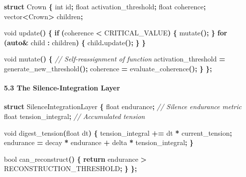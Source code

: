\documentclass[
  11pt,
  a4paper,
]{article}
\newenvironment{Shaded}{\begin{snugshade}}{\end{snugshade}}
\newcommand{\CommentTok}[1]{\textcolor[rgb]{0.56,0.35,0.01}{\textit{#1}}}
\newcommand{\ControlFlowTok}[1]{\textcolor[rgb]{0.13,0.29,0.53}{\textbf{#1}}}
\newcommand{\DataTypeTok}[1]{\textcolor[rgb]{0.13,0.29,0.53}{#1}}
\newcommand{\KeywordTok}[1]{\textcolor[rgb]{0.13,0.29,0.53}{\textbf{#1}}}
\newcommand{\NormalTok}[1]{#1}
\newcommand{\OperatorTok}[1]{\textcolor[rgb]{0.81,0.36,0.00}{\textbf{#1}}}
\begin{document}
\begin{Shaded}
\begin{Highlighting}[]
\KeywordTok{struct}\NormalTok{ Crown }\OperatorTok{\{}
    \DataTypeTok{int}\NormalTok{ id}\OperatorTok{;}
    \DataTypeTok{float}\NormalTok{ activation\_threshold}\OperatorTok{;}
    \DataTypeTok{float}\NormalTok{ coherence}\OperatorTok{;}
\NormalTok{    vector}\OperatorTok{\textless{}}\NormalTok{Crown}\OperatorTok{\textgreater{}}\NormalTok{ children}\OperatorTok{;}
    
    \DataTypeTok{void}\NormalTok{ update}\OperatorTok{()} \OperatorTok{\{}
        \ControlFlowTok{if} \OperatorTok{(}\NormalTok{coherence }\OperatorTok{\textless{}}\NormalTok{ CRITICAL\_VALUE}\OperatorTok{)} \OperatorTok{\{}
\NormalTok{            mutate}\OperatorTok{();}
        \OperatorTok{\}}
        \ControlFlowTok{for} \OperatorTok{(}\KeywordTok{auto}\OperatorTok{\&}\NormalTok{ child }\OperatorTok{:}\NormalTok{ children}\OperatorTok{)} \OperatorTok{\{}
\NormalTok{            child}\OperatorTok{.}\NormalTok{update}\OperatorTok{();}
        \OperatorTok{\}}
    \OperatorTok{\}}
    
    \DataTypeTok{void}\NormalTok{ mutate}\OperatorTok{()} \OperatorTok{\{}
        \CommentTok{// Self{-}reassignment of function}
\NormalTok{        activation\_threshold }\OperatorTok{=}\NormalTok{ generate\_new\_threshold}\OperatorTok{();}
\NormalTok{        coherence }\OperatorTok{=}\NormalTok{ evaluate\_coherence}\OperatorTok{();}
    \OperatorTok{\}}
\OperatorTok{\};}
\end{Highlighting}
\end{Shaded}

\paragraph{5.3 The Silence-Integration
Layer}\label{the-silence-integration-layer}

\begin{Shaded}
\begin{Highlighting}[]
\KeywordTok{struct}\NormalTok{ SilenceIntegrationLayer }\OperatorTok{\{}
    \DataTypeTok{float}\NormalTok{ endurance}\OperatorTok{;}         \CommentTok{// Silence endurance metric}
    \DataTypeTok{float}\NormalTok{ tension\_integral}\OperatorTok{;}  \CommentTok{// Accumulated tension}
    
    \DataTypeTok{void}\NormalTok{ digest\_tension}\OperatorTok{(}\DataTypeTok{float}\NormalTok{ dt}\OperatorTok{)} \OperatorTok{\{}
\NormalTok{        tension\_integral }\OperatorTok{+=}\NormalTok{ dt }\OperatorTok{*}\NormalTok{ current\_tension}\OperatorTok{;}
\NormalTok{        endurance }\OperatorTok{=}\NormalTok{ decay }\OperatorTok{*}\NormalTok{ endurance }\OperatorTok{+}\NormalTok{ delta }\OperatorTok{*}\NormalTok{ tension\_integral}\OperatorTok{;}
    \OperatorTok{\}}
    
    \DataTypeTok{bool}\NormalTok{ can\_reconstruct}\OperatorTok{()} \OperatorTok{\{}
        \ControlFlowTok{return}\NormalTok{ endurance }\OperatorTok{\textgreater{}}\NormalTok{ RECONSTRUCTION\_THRESHOLD}\OperatorTok{;}
    \OperatorTok{\}}
\OperatorTok{\};}
\end{Highlighting}
\end{Shaded}
\end{document}

